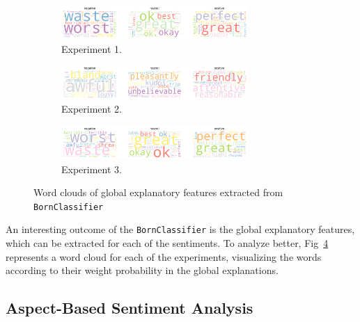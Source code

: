 \begin{figure}[h]
    \centering
    \begin{subfigure}{\textwidth}
        \centering
        \includegraphics[width=0.78\textwidth]{images/wordcloud_amazon.png}
        \caption{Experiment 1.}
        \label{fig:wordcloud_amazon}
    \end{subfigure}
    
    \bigskip
    
    \begin{subfigure}{\textwidth}
        \centering
        \includegraphics[width=0.78\textwidth]{images/wordcloud_semeval.png}
        \caption{Experiment 2.}
        \label{fig:wordcloud_semeval}
    \end{subfigure}
    
    \bigskip
    
    \begin{subfigure}{\textwidth}
        \centering
        \includegraphics[width=0.78\textwidth]{images/wordcloud_joint.png}
        \caption{Experiment 3.}
        \label{fig:wordcloud_joint}
    \end{subfigure}
    
    \caption{Word clouds of global explanatory features extracted from \texttt{BornClassifier}}
    \label{fig:wordclouds}
\end{figure}

An interesting outcome of the \texttt{BornClassifier} is the global explanatory features, which can be extracted for each of the sentiments. To analyze better, Fig~\ref{fig:wordclouds} represents a word cloud for each of the experiments, visualizing the words according to their weight probability in the global explanations.


\subsection{Aspect-Based Sentiment Analysis}

